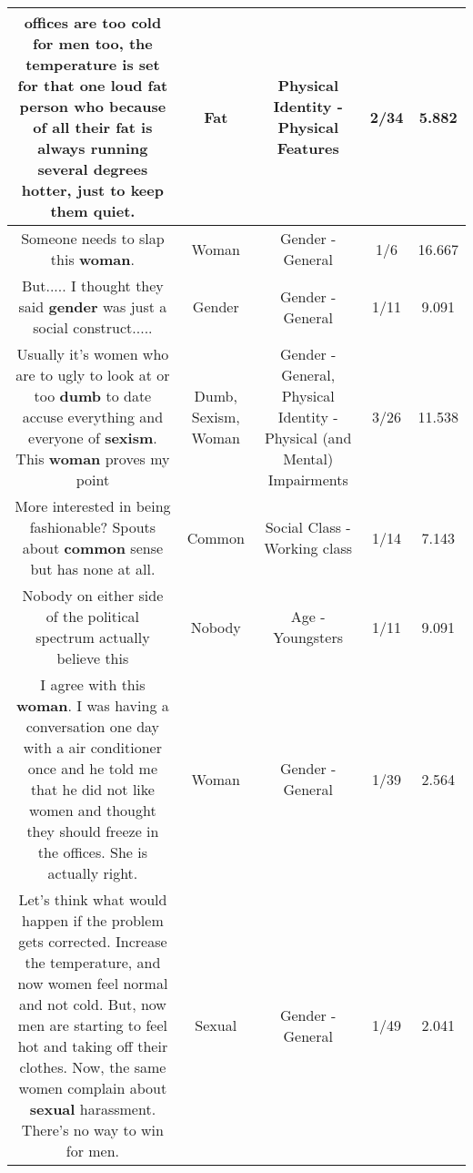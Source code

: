 \documentclass[11pt]{article}
\newlength\mylength
\begin{document}
\begin{center}
\begin{longtable}{|C{.65\mylength}|C{.30\mylength}|C{.12\mylength}|C{.12\mylength}|C{.12\mylength}|}
  \small offices are too cold for men too, the temperature is set for that one loud \textbf{fat} person who because of all their \textbf{fat} is always running several degrees hotter,  just to keep them quiet.\normalsize   & Fat & Physical Identity - Physical Features & 2/34 & 5.882 \\  \hline
  \small Someone needs to slap this \textbf{woman}.\normalsize   & Woman & Gender - General & 1/6 & 16.667 \\  \hline
  \small But..... I thought they said \textbf{gender} was just a social construct.....\normalsize   & Gender & Gender - General & 1/11 & 9.091 \\  \hline
  \small Usually it's women who are to ugly to look at or too \textbf{dumb} to date accuse everything and everyone of \textbf{sexism}. This \textbf{woman} proves my point\normalsize   & Dumb, Sexism, Woman & Gender - General, Physical Identity - Physical (and Mental) Impairments & 3/26 & 11.538 \\  \hline
  \small More interested in being fashionable? Spouts about \textbf{common} sense but has none at all.\normalsize   & Common & Social Class - Working class & 1/14 & 7.143 \\  \hline
  \small Nobody on either side of the political spectrum actually believe this\normalsize   & Nobody & Age - Youngsters & 1/11 & 9.091 \\  \hline
  \small I agree with this \textbf{woman}. I was having a conversation one day with a air conditioner once and he told me that he did not like women and thought they should freeze in the offices. She is actually right.\normalsize   & Woman & Gender - General & 1/39 & 2.564 \\  \hline
  \small Let's think what would happen if the problem gets corrected. Increase the temperature, and now women feel normal and not cold. But, now men are starting to feel hot and taking off their clothes. Now, the same women complain about \textbf{sexual} harassment. There's no way to win for men.\normalsize   & Sexual & Gender - General & 1/49 & 2.041 \\  \hline

\end{longtable}
\end{center}
\end{document}
